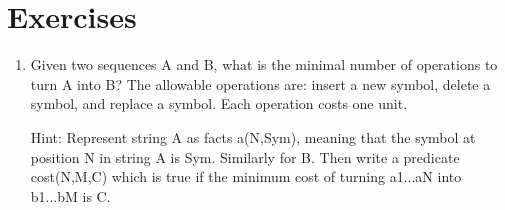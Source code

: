 \section{Exercises}


\begin{enumerate}
\item
Given two sequences A and B, what is the minimal number of operations
to turn A into B?  The allowable operations are: insert a new symbol,
delete a symbol, and replace a symbol.  Each operation costs one unit.

Hint: Represent string A as facts a(N,Sym), meaning that the symbol at 
position N in string A is Sym.  Similarly for B.  Then write a
predicate cost(N,M,C) which is true if the minimum cost of turning
a1...aN into b1...bM is C.
\end{enumerate}
